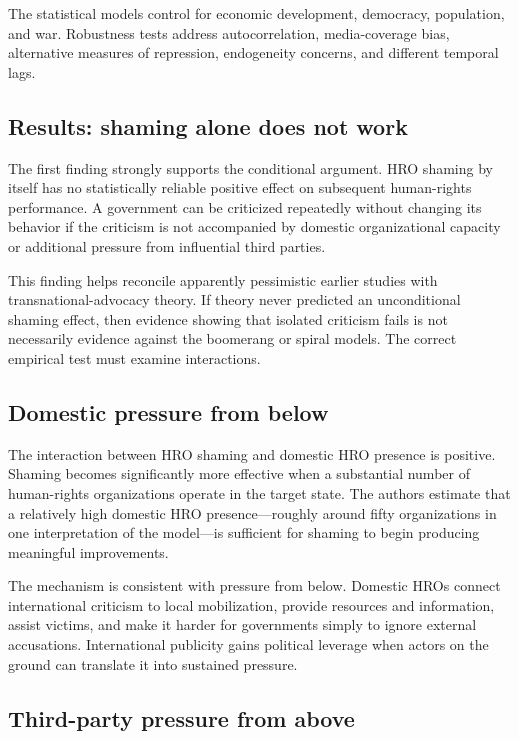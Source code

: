 The statistical models control for economic development, democracy, population, and war. Robustness tests address autocorrelation, media-coverage bias, alternative measures of repression, endogeneity concerns, and different temporal lags.

\subsection{Results: shaming alone does not work}

The first finding strongly supports the conditional argument. HRO shaming by itself has no statistically reliable positive effect on subsequent human-rights performance. A government can be criticized repeatedly without changing its behavior if the criticism is not accompanied by domestic organizational capacity or additional pressure from influential third parties.

This finding helps reconcile apparently pessimistic earlier studies with transnational-advocacy theory. If theory never predicted an unconditional shaming effect, then evidence showing that isolated criticism fails is not necessarily evidence against the boomerang or spiral models. The correct empirical test must examine interactions.

\subsection{Domestic pressure from below}

The interaction between HRO shaming and domestic HRO presence is positive. Shaming becomes significantly more effective when a substantial number of human-rights organizations operate in the target state. The authors estimate that a relatively high domestic HRO presence---roughly around fifty organizations in one interpretation of the model---is sufficient for shaming to begin producing meaningful improvements.

The mechanism is consistent with pressure from below. Domestic HROs connect international criticism to local mobilization, provide resources and information, assist victims, and make it harder for governments simply to ignore external accusations. International publicity gains political leverage when actors on the ground can translate it into sustained pressure.

\subsection{Third-party pressure from above}

